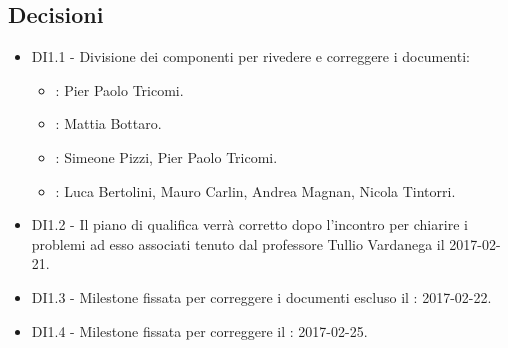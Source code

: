 \documentclass[a4paper,titlepage]{article}
\begin{document}
 \subsection{Decisioni}
 \begin{itemize}
  \item DI1.1 - Divisione dei componenti per rivedere e correggere i documenti:
  	\begin{itemize}
  		\item \NPdocRR{}: Pier Paolo Tricomi.
  		\item \PPdocRR{}: Mattia Bottaro.
  		\item \PQdocRR{}: Simeone Pizzi, Pier Paolo Tricomi.
  		\item \ARdocRR{}: Luca Bertolini, Mauro Carlin, Andrea Magnan, Nicola Tintorri.
  	\end{itemize}
  \item DI1.2 - Il piano di qualifica verrà corretto dopo l'incontro per chiarire i problemi ad esso associati tenuto dal professore Tullio Vardanega il 2017-02-21.
  \item DI1.3 - Milestone fissata per correggere i documenti escluso il \PQdocRR : 2017-02-22.
  \item DI1.4 - Milestone fissata per correggere il \PQdocRR : 2017-02-25.
 \end{itemize}
\end{document}
